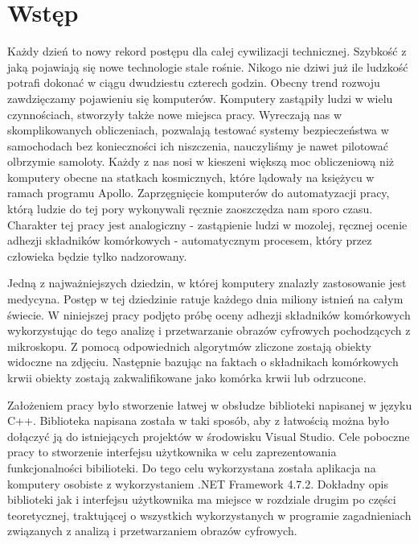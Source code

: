 \documentclass{article}
\begin{document}
    \section{Wstęp}
    {
        \Large
        \justifying
        \quad 
        Każdy dzień to nowy rekord postępu dla całej cywilizacji technicznej.
        Szybkość z jaką pojawiają się nowe technologie stale rośnie.
        Nikogo nie dziwi już ile ludzkość potrafi dokonać w ciągu dwudziestu czterech godzin.
        Obecny trend rozwoju zawdzięczamy pojawieniu się komputerów.
        Komputery zastąpiły ludzi w wielu czynnościach, stworzyły także nowe miejsca pracy.
        Wyreczają nas w skomplikowanych obliczeniach, pozwalają testować systemy bezpieczeństwa w samochodach bez konieczności ich niszczenia, nauczyliśmy je nawet pilotować olbrzymie samoloty.
        Każdy z nas nosi w kieszeni większą moc obliczeniową niż komputery obecne na statkach kosmicznych, które lądowały na księżycu w ramach programu Apollo.
        Zaprzęgnięcie komputerów do automatyzacji pracy, którą ludzie do tej pory wykonywali ręcznie zaoszczędza nam sporo czasu.
        Charakter tej pracy jest analogiczny - zastąpienie ludzi w mozolej, ręcznej ocenie adhezji składników komórkowych -
        automatycznym procesem, który przez człowieka będzie tylko nadzorowany.
    }
    
    \vspace{0.5cm}
    {
        \Large
        \justifying
        Jedną z najważniejszych dziedzin, w której komputery znalazły zastosowanie jest medycyna.
        Postęp w tej dziedzinie ratuje każdego dnia miliony istnień na całym świecie.
        W niniejszej pracy podjęto próbę oceny adhezji składników komórkowych wykorzystując do tego analizę i przetwarzanie obrazów cyfrowych pochodzących z mikroskopu.
        Z pomocą odpowiednich algorytmów zliczone zostają obiekty widoczne na zdjęciu.
        Następnie bazując na faktach o składnikach komórkowych krwii obiekty zostają zakwalifikowane jako komórka krwii lub odrzucone.
    }

    \vspace{0.5cm}
    {
        \Large
        \justifying
        Założeniem pracy było stworzenie łatwej w obsłudze biblioteki napisanej w języku C++.
        Biblioteka napisana została w taki sposób, aby z łatwością można było dołączyć ją do istniejących projektów w środowisku Visual Studio.
        Cele poboczne pracy to stworzenie interfejsu użytkownika w celu zaprezentowania funkcjonalności bibilioteki.
        Do tego celu wykorzystana została aplikacja na komputery osobiste z wykorzystaniem .NET Framework 4.7.2.
        Dokładny opis biblioteki jak i interfejsu użytkownika ma miejsce w rozdziale drugim po części teoretycznej, traktującej o wszystkich wykorzystanych w programie zagadnieniach związanych z analizą i przetwarzaniem obrazów cyfrowych.
    }
\end{document}
